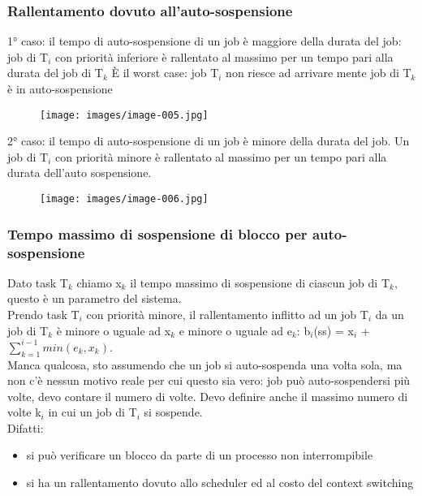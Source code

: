 \documentclass[12pt, oneside]{extbook}
\begin{document}
\subsubsection{Rallentamento dovuto all'auto-sospensione}
1° caso: il tempo di auto-sospensione di un job è maggiore della durata del job: job di T$_{i}$ con priorità inferiore è rallentato al massimo per un tempo pari alla durata del job di T$_{k}$ È il worst case: job T$_{i}$ non riesce ad arrivare mente job di T$_{k}$ è in auto-sospensione\\
\begin{figure}[!h]
\centering
\texttt{[image: images/image-005.jpg]}
\end{figure}
2° caso: il tempo di auto-sospensione di un job è minore della durata del job. Un job di T$_{i}$ con priorità minore è rallentato al massimo per un tempo pari alla durata dell'auto sospensione.\\
\begin{figure}[!h]
\centering
\texttt{[image: images/image-006.jpg]}
\end{figure}
\subsubsection{Tempo massimo di sospensione di blocco per auto-sospensione}
Dato task T$_{k}$ chiamo x$_{k}$ il tempo massimo di sospensione di ciascun job di T$_{k}$, questo è un parametro del sistema.\\ Prendo task T$_{i}$ con priorità minore, il rallentamento inflitto ad un job T$_{i}$ da un job di T$_{k}$ è minore o uguale ad x$_{k}$ e minore o uguale ad e$_{k}$:
b$_{i}$(ss) = x$_{i}$ + $\sum\limits_{k = 1}^{i-1}min(e_{k}, x_{k})$.\\ Manca qualcosa, sto assumendo che un job si auto-sospenda una volta sola, ma non c'è nessun motivo reale per cui questo sia vero: job può auto-sospendersi più volte, devo contare il numero di volte. Devo definire anche il massimo numero di volte k$_{i}$ in cui un job di T$_{i}$ si sospende.\\ Difatti:
\begin{itemize}
\item si può verificare un blocco da parte di un processo non interrompibile
\item si ha un rallentamento dovuto allo scheduler ed al costo del context switching
\end{itemize}
\end{document}
